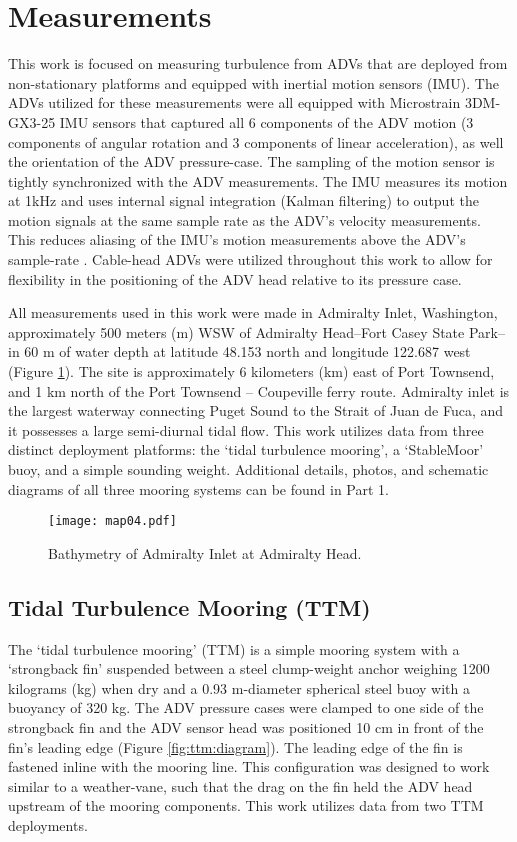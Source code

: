 
\section{Measurements}
\label{sec:meas}

This work is focused on measuring turbulence from ADVs that are deployed from non-stationary platforms and equipped with inertial motion sensors (IMU). The ADVs utilized for these measurements were all equipped with Microstrain 3DM-GX3-25 IMU sensors that captured all 6 components of the ADV motion (3 components of angular rotation and 3 components of linear acceleration), as well the orientation of the ADV pressure-case. The sampling of the motion sensor is tightly synchronized with the ADV measurements. The IMU measures its motion at 1kHz and uses internal signal integration (Kalman filtering) to output the motion signals at the same sample rate as the ADV's velocity measurements. This reduces aliasing of the IMU's motion measurements above the ADV's sample-rate \citep[]{3DM-GX3_coning_sculling}. Cable-head ADVs were utilized throughout this work to allow for flexibility in the positioning of the ADV head relative to its pressure case.

All measurements used in this work were made in Admiralty Inlet, Washington, approximately 500 meters (m) WSW of Admiralty Head--Fort Casey State Park--in 60 m of water depth at latitude 48.153 north and longitude 122.687 west (Figure \ref{fig:map}). The site is approximately 6 kilometers (km) east of Port Townsend, and 1 km north of the Port Townsend -- Coupeville ferry route.  Admiralty inlet is the largest waterway connecting Puget Sound to the Strait of Juan de Fuca, and it possesses a large semi-diurnal tidal flow.  This work utilizes data from three distinct deployment platforms: the `tidal turbulence mooring', a `StableMoor' buoy, and a simple sounding weight.  Additional details, photos, and schematic diagrams of all three mooring systems can be found in Part 1.

\begin{figure}[t]
  \centering
  \texttt{[image: map04.pdf]}
  \caption{Bathymetry of Admiralty Inlet at Admiralty Head.}
  \label{fig:map}
\end{figure}

\subsection{Tidal Turbulence Mooring (TTM)}

The `tidal turbulence mooring' (TTM) is a simple mooring system with a `strongback fin' suspended between a steel clump-weight anchor weighing 1200 kilograms (kg) when dry and a 0.93 m-diameter spherical steel buoy with a buoyancy of 320 kg. The ADV pressure cases were clamped to one side of the strongback fin and the ADV sensor head was positioned 10 cm in front of the fin's leading edge (Figure \ref{fig:ttm:diagram}). The leading edge of the fin is fastened inline with the mooring line. This configuration  was designed to work similar to a weather-vane, such that the drag on the fin held the ADV head upstream of the mooring components.  This work utilizes data from two TTM deployments. 

